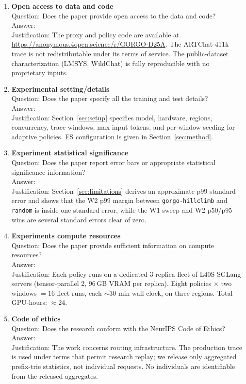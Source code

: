 \documentclass{article}
\begin{document}
\begin{enumerate}
\item {\bf Open access to data and code}\\
Question: Does the paper provide open access to the data and code?\\
Answer: \answerYes{}\\
Justification: The proxy and policy code are available at \href{https://anonymous.4open.science/r/GORGO-D25A}{https://anonymous.4open.science/r/GORGO-D25A}. The ARTChat-411k trace is not redistributable under its terms of service. The public-dataset characterization (LMSYS, WildChat) is fully reproducible with no proprietary inputs.

\item {\bf Experimental setting/details}\\
Question: Does the paper specify all the training and test details?\\
Answer: \answerYes{}\\
Justification: Section~\ref{sec:setup} specifies model, hardware, regions, concurrency, trace windows, max input tokens, and per-window seeding for adaptive policies. ES configuration is given in Section~\ref{sec:method}.

\item {\bf Experiment statistical significance}\\
Question: Does the paper report error bars or appropriate statistical significance information?\\
Answer: \answerYes{}\\
Justification: Section~\ref{sec:limitations} derives an approximate p99 standard error and shows that the W2 p99 margin between \texttt{gorgo-hillclimb} and \texttt{random} is inside one standard error, while the W1 sweep and W2 p50/p95 wins are several standard errors clear of zero.

\item {\bf Experiments compute resources}\\
Question: Does the paper provide sufficient information on compute resources?\\
Answer: \answerYes{}\\
Justification: Each policy runs on a dedicated 3-replica fleet of L40S SGLang servers (tensor-parallel 2, 96\,GB VRAM per replica). Eight policies $\times$ two windows $= 16$ fleet-runs, each $\sim$30 min wall clock, on three regions. Total GPU-hours: $\approx$24.

\item {\bf Code of ethics}\\
Question: Does the research conform with the NeurIPS Code of Ethics?\\
Answer: \answerYes{}\\
Justification: The work concerns routing infrastructure. The production trace is used under terms that permit research replay; we release only aggregated prefix-trie statistics, not individual requests. No individuals are identifiable from the released aggregates.


\end{enumerate}
\end{document}
